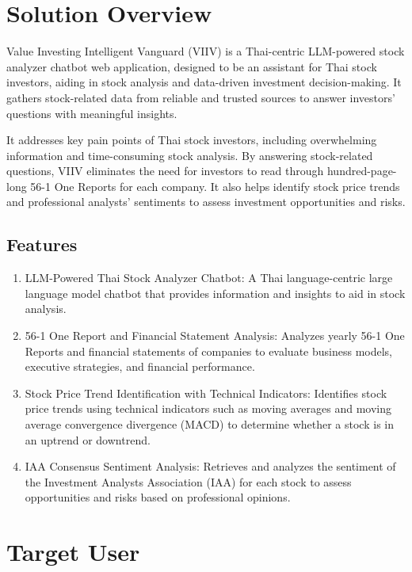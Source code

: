 \section{Solution Overview}
\label{section:solution-overview}

Value Investing Intelligent Vanguard (VIIV) is a Thai-centric LLM-powered stock analyzer chatbot web application, designed to be an assistant for Thai stock investors,
aiding in stock analysis and data-driven investment decision-making. It gathers stock-related data from reliable and trusted sources to answer investors' questions with meaningful insights.

It addresses key pain points of Thai stock investors, including overwhelming information and time-consuming stock analysis. By answering stock-related questions,
VIIV eliminates the need for investors to read through hundred-page-long 56-1 One Reports for each company. It also helps identify stock price trends and professional analysts'
sentiments to assess investment opportunities and risks.

\subsection{Features}
\label{subsection:features}

\begin{enumerate}[leftmargin=80pt]
    \item LLM-Powered Thai Stock Analyzer Chatbot: A Thai language-centric large language model chatbot that provides information and insights to aid in stock analysis.
    \item 56-1 One Report and Financial Statement Analysis: Analyzes yearly 56-1 One Reports and financial statements of companies to evaluate business models, executive strategies, and financial performance.
    \item Stock Price Trend Identification with Technical Indicators: Identifies stock price trends using technical indicators such as moving averages and moving average convergence divergence (MACD) to determine whether a stock is in an uptrend or downtrend.
    \item IAA Consensus Sentiment Analysis: Retrieves and analyzes the sentiment of the Investment Analysts Association (IAA) for each stock to assess opportunities and risks based on professional opinions.
\end{enumerate}

\section{Target User}
\label{section:target-user}

